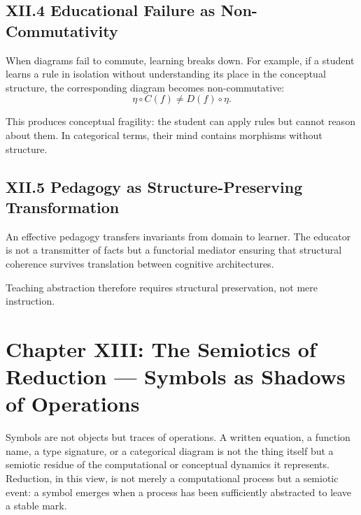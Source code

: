 \documentclass[11pt,letterpaper]{article}
\begin{document}
\subsection{XII.4 Educational Failure as Non-Commutativity}

When diagrams fail to commute, learning breaks down. For example, if a student learns a rule in isolation without understanding its place in the conceptual structure, the corresponding diagram becomes non-commutative:
\[
\eta \circ C(f) \neq D(f) \circ \eta.
\]

This produces conceptual fragility: the student can apply rules but cannot reason about them. In categorical terms, their mind contains morphisms without structure.

\subsection{XII.5 Pedagogy as Structure-Preserving Transformation}

An effective pedagogy transfers invariants from domain to learner. The educator is not a transmitter of facts but a functorial mediator ensuring that structural coherence survives translation between cognitive architectures.

Teaching abstraction therefore requires structural preservation, not mere instruction.

\newpage

\section{Chapter XIII: The Semiotics of Reduction — Symbols as Shadows of Operations}

Symbols are not objects but traces of operations. A written equation, a function name, a type signature, or a categorical diagram is not the thing itself but a semiotic residue of the computational or conceptual dynamics it represents. Reduction, in this view, is not merely a computational process but a semiotic event: a symbol emerges when a process has been sufficiently abstracted to leave a stable mark.

\end{document}

